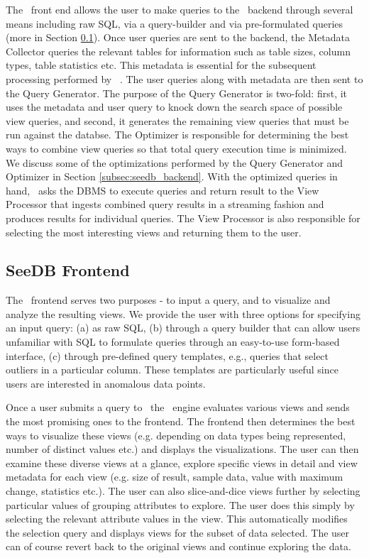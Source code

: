 The \SeeDB\ front end allows the user to make queries to the \SeeDB\ backend
through several means including raw SQL, via a query-builder and via
pre-formulated queries (more in Section \ref{subsec:seedb_frontend}). Once user
queries are sent to the backend, the Metadata Collector queries the relevant
tables for information such as table sizes, column types, table statistics etc.
This metadata is essential for the subsequent processing performed by \SeeDB\ .
The user queries along with metadata are then sent to the Query Generator.
The purpose of the Query Generator is two-fold: first, it uses the metadata and
user query to knock down the search space of possible view queries, and second,
it generates the remaining view queries that must be run against the databse.
The Optimizer is responsible for determining the best ways to combine view
queries so that total query execution time is minimized. We discuss some of the
optimizations performed by the Query Generator and Optimizer in Section
\ref{subsec:seedb_backend}. With the optimized queries in hand, \SeeDB\ asks the
DBMS to execute queries and return result to the View Processor that ingests
combined query results in a streaming fashion and produces results for
individual queries. The View Processor is also responsible for selecting the
most interesting views and returning them to the user.

\subsection{SeeDB Frontend}
\label{subsec:seedb_frontend}

The \SeeDB\ frontend serves two purposes - to input a query, and to visualize
and analyze the resulting views. We provide the user with three options for
specifying an input query: (a) as raw SQL, (b) through a query builder that can
allow users unfamiliar with SQL to formulate queries through an easy-to-use
form-based interface, (c) through pre-defined query templates, e.g., queries
that select outliers in a particular column. These templates are particularly
useful since users are interested in anomalous data points.

Once a user submits a query to \SeeDB\, the \SeeDB\ engine evaluates various
views and sends the most promising ones to the frontend. The frontend then
determines the best ways to visualize these views (e.g. depending on data types
being represented, number of distinct values etc.) and displays the
visualizations. The user can then examine these diverse views at a glance,
explore specific views in detail and view metadata for each view (e.g. size of
result, sample data, value with maximum change, statistics etc.). The user can
also slice-and-dice views further by selecting particular values of grouping
attributes to explore. The user does this simply by selecting the relevant
attribute values in the view. This automatically modifies the selection query
and displays views for the subset of data selected. The user can of course
revert back to the original views and continue exploring the data.

